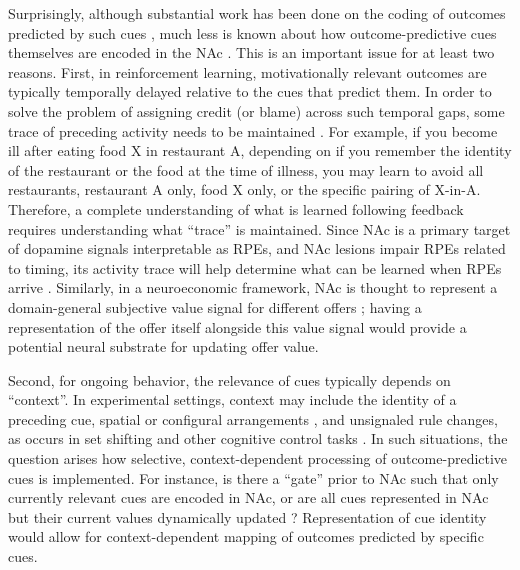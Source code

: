 \documentclass[11pt]{article}
\let\cite=\citep
\begin{document}
Surprisingly, although substantial work has been done on the coding of
outcomes predicted by such cues
\cite{Schultz1992,Hollerman1998,Hassani2001,Cromwell2003,Setlow2003,Nicola2004,Roitman2005,Day2006,Roesch2009a,Saddoris2011,Goldstein2012,Lansink2012,Bissonette2013,McGinty2013,Atallah2014,Sugam2014,Cooch2015,West2016},
much less is known about how outcome-predictive cues themselves are
encoded in the NAc \cite[but see;][]{Sleezer2016}. This is an
important issue for at least two reasons. First, in reinforcement
learning, motivationally relevant outcomes are typically temporally
delayed relative to the cues that predict them. In order to solve the
problem of assigning credit (or blame) across such temporal gaps, some
trace of preceding activity needs to be maintained
\cite{sutton1998,Lee2012}. For example, if you become ill after eating
food X in restaurant A, depending on if you remember the identity of
the restaurant or the food at the time of illness, you may learn to
avoid all restaurants, restaurant A only, food X only, or the specific
pairing of X-in-A. Therefore, a complete understanding of what is
learned following feedback requires understanding what “trace” is
maintained. Since NAc is a primary target of dopamine signals interpretable
as RPEs, and NAc lesions impair RPEs related to timing, its activity
trace will help determine what can be learned when RPEs arrive
\cite{Ikemoto2007,McDannald2011,Hart2014,Hamid2016,Takahashi2016}. Similarly,
in a neuroeconomic framework, NAc is thought to represent a
domain-general subjective value signal for different offers
\cite{Peters2009,Levy2012,Bartra2013,Sescousse2015}; having a representation of
the offer itself alongside this value signal would provide a potential neural substrate for updating offer
value.

Second, for ongoing behavior, the relevance of cues typically depends
on “context”. In experimental settings, context may include the
identity of a preceding cue, spatial or configural arrangements
\cite{Holland1992,Bouton1993,Honey2014}, and unsignaled rule changes, as
occurs in set shifting and other cognitive control tasks
\cite{Grant1948,cohen1992context,Floresco2006a,Sleezer2016}. In such
situations, the question arises how selective, context-dependent
processing of outcome-predictive cues is implemented. For instance, is
there a “gate” prior to NAc such that only currently relevant cues are
encoded in NAc, or are all cues represented in NAc but their current
values dynamically updated
\cite{Goto2008,Fitzgerald2014,Sleezer2016}? Representation of cue
identity would allow for context-dependent mapping of outcomes
predicted by specific cues.
\end{document}
